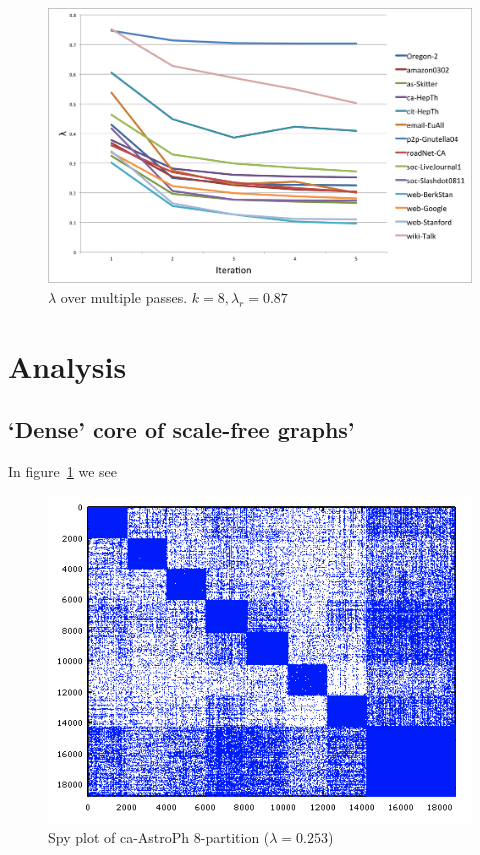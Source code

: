 \documentclass[11pt]{article}
\begin{document}
\begin{figure}[h]
\centering
\includegraphics[scale=0.55] {figures/line_plot_lambda}
\caption[Caption for]{$\lambda$ over multiple passes. $k=8, \lambda_r = 0.87$}
\end{figure}

\section{Analysis}
\subsection{`Dense' core of scale-free graphs'}
In figure~\ref{fig:dense} we see 
\begin{figure}[h!]
\centering
  \includegraphics[width=.7\textwidth]{figures/astroPh8.png}
  \caption{Spy plot of ca-AstroPh 8-partition ($\lambda=0.253$)}
  \label{fig:dense}
\end{figure}

~\cite{Lang04findinggood}




\end{document}
